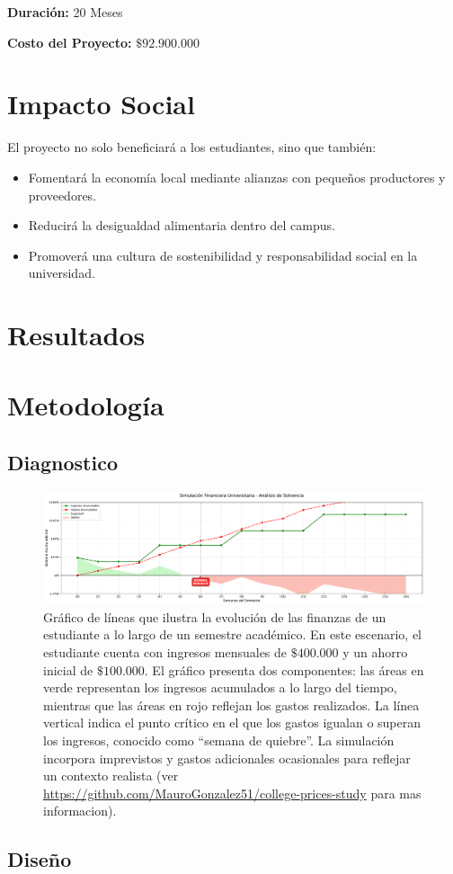 \documentclass[letterpaper, 9pt]{article}
\begin{document}
\bigskip
\noindent \textbf{Duración:} 20 Meses

\bigskip
\noindent \textbf{Costo del Proyecto:} \(\$92.900.000\)

\section{Impacto Social}
El proyecto no solo beneficiará a los estudiantes, sino que también:
\begin{itemize}
    \item Fomentará la economía local mediante alianzas con pequeños productores y proveedores.
    \item Reducirá la desigualdad alimentaria dentro del campus.
    \item Promoverá una cultura de sostenibilidad y responsabilidad social en la universidad.
\end{itemize}

\section{Resultados}

\section{Metodología}

\subsection{Diagnostico}

\begin{figure}[ht]
     \centering
     \includegraphics[width=\textwidth]{Images/graph.pdf} 
 
      \caption{Gráfico de líneas que ilustra la evolución de las finanzas de un estudiante a lo largo de un semestre académico. En este escenario, el estudiante cuenta con ingresos mensuales de \(\$400.000\) y un ahorro inicial de \(\$100.000\). El gráfico presenta dos componentes: las áreas en verde representan los ingresos acumulados a lo largo del tiempo, mientras que las áreas en rojo reflejan los gastos realizados. La línea vertical indica el punto crítico en el que los gastos igualan o superan los ingresos, conocido como ``semana de quiebre''. La simulación incorpora imprevistos y gastos adicionales ocasionales para reflejar un contexto realista (ver \url{https://github.com/MauroGonzalez51/college-prices-study} para mas informacion).}
\end{figure}

\subsection{Diseño}



\end{document}

